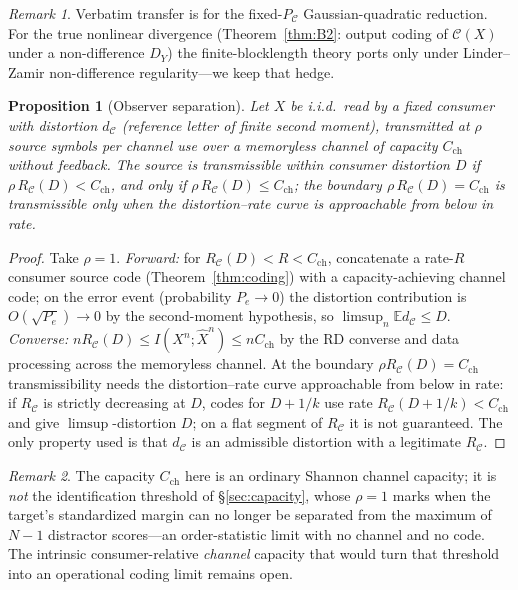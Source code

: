 \documentclass[lettersize,onecolumn]{IEEEtran}
\newtheorem{proposition}{Proposition}
\theoremstyle{definition}
\theoremstyle{remark}
\newtheorem*{remark}{Remark}
\newcommand{\PC}{P_{\mathcal{C}}}
\newcommand{\E}{\mathbb{E}}
\begin{document}
\begin{remark}
Verbatim transfer is for the fixed-$\PC$ Gaussian-quadratic reduction. For the true
nonlinear divergence (Theorem~\ref{thm:B2}: output coding of $\mathcal C(X)$ under a
non-difference $D_Y$) the finite-blocklength theory ports only under Linder--Zamir
\cite{linderzamir1999} non-difference regularity---we keep that hedge.
\end{remark}

\begin{proposition}[Observer separation]\label{prop:separation}
Let $X$ be i.i.d.\ read by a fixed consumer with distortion $d_{\mathcal C}$ (reference
letter of finite second moment), transmitted at $\rho$ source symbols per channel use over
a memoryless channel of capacity $C_{\mathrm{ch}}$ without feedback. The source is
transmissible within consumer distortion $D$ if $\rho\,R_{\mathcal C}(D)<C_{\mathrm{ch}}$,
and only if $\rho\,R_{\mathcal C}(D)\le C_{\mathrm{ch}}$; the boundary
$\rho\,R_{\mathcal C}(D)=C_{\mathrm{ch}}$ is transmissible only when the distortion--rate
curve is approachable from below in rate.
\end{proposition}
\begin{proof}
Take $\rho=1$. \emph{Forward:} for $R_{\mathcal C}(D)<R<C_{\mathrm{ch}}$, concatenate a
rate-$R$ consumer source code (Theorem~\ref{thm:coding}) with a capacity-achieving channel
code; on the error event (probability $P_e\to0$) the distortion contribution is
$O(\sqrt{P_e})\to0$ by the second-moment hypothesis, so $\limsup_n\E d_{\mathcal C}\le D$.
\emph{Converse:} $nR_{\mathcal C}(D)\le I(X^n;\hat X^n)\le nC_{\mathrm{ch}}$ by the RD
converse and data processing across the memoryless channel. At the boundary $\rho
R_{\mathcal C}(D)=C_{\mathrm{ch}}$ transmissibility needs the distortion--rate curve
approachable from below in rate: if $R_{\mathcal C}$ is strictly decreasing at $D$, codes
for $D+1/k$ use rate $R_{\mathcal C}(D+1/k)<C_{\mathrm{ch}}$ and give $\limsup$-distortion
$D$; on a flat segment of $R_{\mathcal C}$ it is not guaranteed. The only property used is
that $d_{\mathcal C}$ is an admissible distortion with a legitimate $R_{\mathcal C}$.
\end{proof}

\begin{remark}
The capacity $C_{\mathrm{ch}}$ here is an ordinary Shannon channel capacity; it is
\emph{not} the identification threshold of \S\ref{sec:capacity}, whose $\rho=1$ marks when
the target's standardized margin can no longer be separated from the maximum of $N-1$
distractor scores---an order-statistic limit with no channel and no code. The intrinsic
consumer-relative \emph{channel} capacity that would turn that threshold into an
operational coding limit remains open.
\end{remark}
\end{document}
